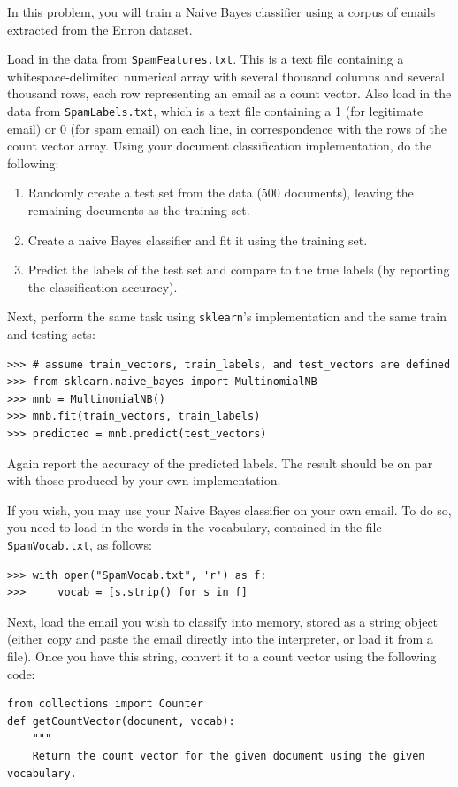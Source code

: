 \begin{problem}
In this problem, you will train a Naive Bayes classifier using a corpus of emails extracted from the Enron dataset.

Load in the data from {\tt SpamFeatures.txt}. This is a text file containing a whitespace-delimited
numerical array with several thousand columns and several thousand rows, each row representing an email
as a count vector.
Also load in the data from {\tt SpamLabels.txt}, which is a text file containing a 1 (for legitimate email) or 0
(for spam email) on each line, in correspondence with the rows of the count vector array.
Using your document classification implementation, do the following:
\begin{enumerate}
\item Randomly create a test set from the data (500 documents), leaving the remaining documents as the training set.
\item Create a naive Bayes classifier and fit it using the training set.
\item Predict the labels of the test set and compare to the true labels (by reporting the classification accuracy).
\end{enumerate}

Next, perform the same task using {\tt sklearn}'s implementation and the same train and testing sets:
\begin{lstlisting}
>>> # assume train_vectors, train_labels, and test_vectors are defined
>>> from sklearn.naive_bayes import MultinomialNB
>>> mnb = MultinomialNB()
>>> mnb.fit(train_vectors, train_labels)
>>> predicted = mnb.predict(test_vectors)
\end{lstlisting}
Again report the accuracy of the predicted labels. The result should be on par with those produced by your
own implementation.

If you wish, you may use your Naive Bayes classifier on your own email.
To do so, you need to load in the words in the vocabulary, contained in the file {\tt SpamVocab.txt}, as follows:
\begin{lstlisting}
>>> with open("SpamVocab.txt", 'r') as f:
>>>     vocab = [s.strip() for s in f]
\end{lstlisting}
Next, load the email you wish to classify into memory, stored as a string object (either copy and paste the email
directly into the interpreter, or load it from a file). Once you have this string, convert it to a count vector using
the following code:
\begin{lstlisting}
from collections import Counter
def getCountVector(document, vocab):
    """
    Return the count vector for the given document using the given vocabulary.


\end{lstlisting}
\end{problem}
